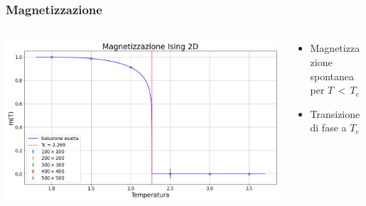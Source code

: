 \begin{frame}
    \frametitle{Magnetizzazione}
    \framesubtitle{}

    \begin{columns}
        \begin{column}{0.6\textwidth}

            \centering
            \includegraphics[width=\textwidth]{Immagini/simIsing2D/magn.png}

        \end{column}
    
        \begin{column}{0.4\textwidth}

                \begin{itemize}[itemsep=0.5em, label=$\diamond$]
                    \item Magnetizzazione spontanea per $T\,<\,T_c$
                    \item Transizione di fase a $T_c$
                \end{itemize}
            
        \end{column}
    \end{columns}

    \centering

\end{frame}



